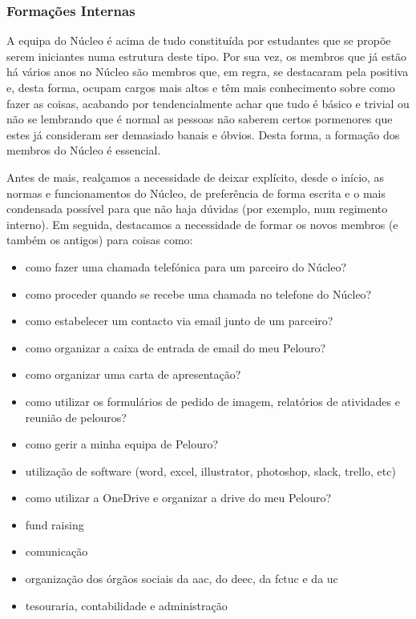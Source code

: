 
\subsubsection{Formações Internas}

A equipa do Núcleo é acima de tudo constituída por estudantes que se propõe serem iniciantes numa estrutura deste tipo. Por sua vez, os membros que já estão há vários anos no Núcleo são membros que, em regra, se destacaram pela positiva e, desta forma, ocupam cargos mais altos e têm mais conhecimento sobre como fazer as coisas, acabando por tendencialmente achar que tudo é básico e trivial ou não se lembrando que é normal as pessoas não saberem certos pormenores que estes já consideram ser demasiado banais e óbvios. Desta forma, a formação dos membros do Núcleo é essencial.

Antes de mais, realçamos a necessidade de deixar explícito, desde o início, as normas e funcionamentos do Núcleo, de preferência de forma escrita e o mais condensada possível para que não haja dúvidas (por exemplo, num regimento interno). Em seguida, destacamos a necessidade de formar os novos membros (e também os antigos) para coisas como:
\begin{itemize}
\item como fazer uma chamada telefónica para um parceiro do Núcleo?
\item como proceder quando se recebe uma chamada no telefone do Núcleo?
\item como estabelecer um contacto via email junto de um parceiro?
\item como organizar a caixa de entrada de email do meu Pelouro?
\item como organizar uma carta de apresentação?
\item como utilizar os formulários de pedido de imagem, relatórios de atividades e reunião de pelouros?
\item como gerir a minha equipa de Pelouro?
\item utilização de software (word, excel, illustrator, photoshop, slack, trello, etc)
\item como utilizar a OneDrive e organizar a drive do meu Pelouro?
\item fund raising
\item comunicação
\item organização dos órgãos sociais da \acrshort{aac}, do \acrshort{deec}, da \acrshort{fctuc} e da \acrshort{uc}
\item tesouraria, contabilidade e administração
\end{itemize}

